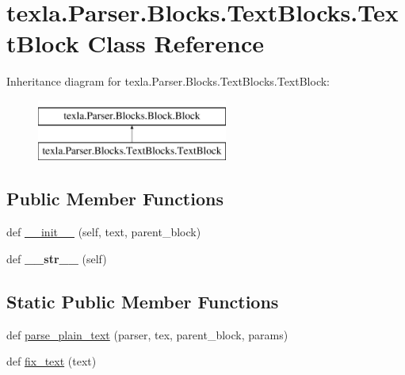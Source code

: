 \hypertarget{classtexla_1_1Parser_1_1Blocks_1_1TextBlocks_1_1TextBlock}{}\section{texla.\+Parser.\+Blocks.\+Text\+Blocks.\+Text\+Block Class Reference}
\label{classtexla_1_1Parser_1_1Blocks_1_1TextBlocks_1_1TextBlock}
Inheritance diagram for texla.\+Parser.\+Blocks.\+Text\+Blocks.\+Text\+Block\+:\begin{figure}[H]
\begin{center}
\leavevmode
\includegraphics[height=2.000000cm]{classtexla_1_1Parser_1_1Blocks_1_1TextBlocks_1_1TextBlock}
\end{center}
\end{figure}
\subsection*{Public Member Functions}
\begin{DoxyCompactItemize}
\item 
def \hyperlink{classtexla_1_1Parser_1_1Blocks_1_1TextBlocks_1_1TextBlock_afc1b469142bce14bab40d102d42203f0}{\+\_\+\+\_\+init\+\_\+\+\_\+} (self, text, parent\+\_\+block)
\item 
\hypertarget{classtexla_1_1Parser_1_1Blocks_1_1TextBlocks_1_1TextBlock_ad878a924a1d956e00a1111396f77c261}{}\label{classtexla_1_1Parser_1_1Blocks_1_1TextBlocks_1_1TextBlock_ad878a924a1d956e00a1111396f77c261} 
def {\bfseries \+\_\+\+\_\+str\+\_\+\+\_\+} (self)
\end{DoxyCompactItemize}
\subsection*{Static Public Member Functions}
\begin{DoxyCompactItemize}
\item 
def \hyperlink{classtexla_1_1Parser_1_1Blocks_1_1TextBlocks_1_1TextBlock_a3a56fbfda7373ac5a103d5af52780b1a}{parse\+\_\+plain\+\_\+text} (parser, tex, parent\+\_\+block, params)
\item 
def \hyperlink{classtexla_1_1Parser_1_1Blocks_1_1TextBlocks_1_1TextBlock_a9abef4d8bec9802fe085eeb1e236f2fb}{fix\+\_\+text} (text)
\end{DoxyCompactItemize}
